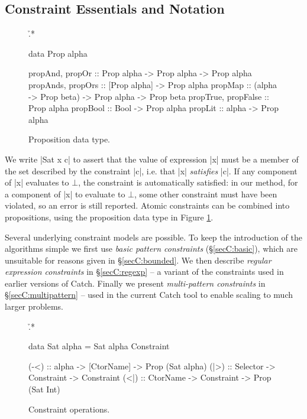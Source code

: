 \subsection{Constraint Essentials and Notation}
\label{secC:constraints}

\begin{figure}
\h{.*}\begin{code}
data Prop alpha

propAnd, propOr           :: Prop alpha -> Prop alpha -> Prop alpha
propAnds, propOrs         :: [Prop alpha] -> Prop alpha
propMap                   :: (alpha -> Prop beta) -> Prop alpha -> Prop beta
propTrue, propFalse       :: Prop alpha
propBool                  :: Bool -> Prop alpha
propLit                   :: alpha -> Prop alpha
\end{code}
\caption{Proposition data type.}
\label{figC:prop}
\end{figure}

We write |Sat x c| to assert that the value of expression |x| must be a member of the set described by the constraint |c|, i.e. that |x| \textit{satisfies} |c|. If any component of |x| evaluates to $\bot{}$, the constraint is automatically satisfied: in our method, for a component of |x| to evaluate to $\bot{}$, some other constraint must have been violated, so an error is still reported. Atomic constraints can be combined into propositions, using the proposition data type in Figure \ref{figC:prop}.

Several underlying constraint models are possible. To keep the introduction of the algorithms simple we first use \textit{basic pattern constraints} (\S\ref{secC:basic}), which are unsuitable for reasons given in \S\ref{secC:bounded}. We then describe \textit{regular expression constraints} in \S\ref{secC:regexp} -- a variant of the constraints used in earlier versions of Catch. Finally we present \textit{multi-pattern constraints} in \S\ref{secC:multipattern} -- used in the current Catch tool to enable scaling to much larger problems.

\begin{figure}
\h{.*}\begin{code}
data Sat alpha = Sat alpha Constraint

(-<)  :: alpha -> [CtorName] -> Prop (Sat alpha)
(|>)  :: Selector -> Constraint -> Constraint
(<|)  :: CtorName -> Constraint -> Prop (Sat Int)
\end{code}
\caption{Constraint operations.}
\label{figC:constraint}
\end{figure}

